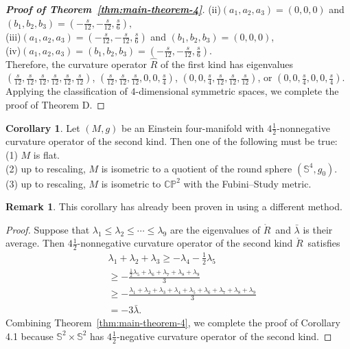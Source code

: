 \documentclass[11pt, reqno]{amsart}
\numberwithin{equation}{section}
\theoremstyle{definition}
\newtheorem{corollary}[thm]{Corollary}
\newtheorem{remark}[thm]{Remark}
\begin{document}
\begin{proof}[\textbf{Proof of Theorem~\ref{thm:main-theorem-4}}]
		(ii)$(a_1,a_2,a_3)=(0,0,0)$ and $(b_1,b_2,b_3)=(-\frac{s}{12},-\frac{s}{12},\frac{s}{6}),$\\ 
		(iii)$(a_1,a_2,a_3)=(-\frac{s}{12},-\frac{s}{12},\frac{s}{6})$ and $(b_1,b_2,b_3)=(0,0,0)$,\\ 
		(iv)$(a_1,a_2,a_3)=(b_1,b_2,b_3)=(-\frac{s}{12},-\frac{s}{12},\frac{s}{6}).$ \\
	Therefore,  the curvature operator $\hat{R}$ of the first kind has eigenvalues $(\frac{s}{12},\frac{s}{12},\frac{s}{12},\frac{s}{12},\frac{s}{12},\frac{s}{12})$, $(\frac{s}{12},\frac{s}{12},\frac{s}{12},0,0,\frac{s}{4})$, $(0,0,\frac{s}{4},\frac{s}{12},\frac{s}{12},\frac{s}{12})$, or $(0,0,\frac{s}{4},0,0,\frac{s}{4})$.	
		Applying the classification of $4$-dimensional symmetric spaces, we complete the proof of Theorem D.
	\end{proof}
	
	
	\begin{corollary}
		Let $(M,g)$ be an Einstein four-manifold with $4\frac12$-nonnegative curvature operator of the second kind.
		Then  one of the following must be true:\\
		(1) $M$ is flat.\\
		(2)  up to rescaling, $M$ is isometric to a quotient of the round sphere $(\mathbb{S}^4, g_0)$.\\
		(3)  up to rescaling, $M$ is isometric to $\mathbb{CP}^2$ with the Fubini–Study metric.
	\end{corollary}
	\begin{remark}
		This corollary has already been proven in \cite{CGT} using a different method.
	\end{remark}
	\begin{proof}
		Suppose that ${\lambda }_1\le {\lambda }_2\le \cdots \le {\lambda }_{9}$
		are the eigenvalues of $\mathring{R}\,$ and $\bar{\lambda }$ is their average. Then $4\frac12$-nonnegative curvature operator of the second kind $\mathring{R}\,$ satisfies
		\begin{align*}
			& {\lambda }_1+{\lambda }_2+{\lambda }_3\geq-{\lambda }_4-\frac12 {\lambda }_5\\ 
			&\geq-\frac{\frac12 {\lambda }_5+{\lambda }_6+{\lambda }_7+{\lambda }_8+{\lambda }_9}{3} \\ 
			& \geq-\frac{{\lambda }_1+{\lambda }_2+{\lambda }_3+{\lambda }_4+{\lambda }_5+{\lambda }_6+{\lambda }_7+{\lambda }_8+{\lambda }_9}{3} \\ 
			& =-3\bar{\lambda }.
		\end{align*}
		Combining Theorem~\ref{thm:main-theorem-4}, we complete the proof  of  Corollary 4.1 because $\mathbb{S}^2\times \mathbb{S}^2$ has $4\frac12$-negative curvature operator of the second kind.
	\end{proof}
	
\end{document}
